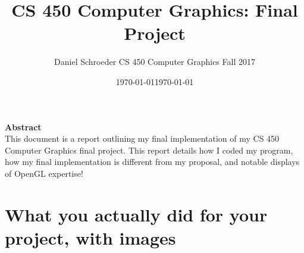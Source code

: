 \documentclass[journal,10pt,onecolumn,compsoc]{IEEEtran}
\title{CS 450 Computer Graphics: \linebreak Final Project}
\author{Daniel Schroeder \linebreak CS 450 Computer Graphics \linebreak Fall 2017}
\date{\today}
\begin{document}
  \maketitle

  \date{\today}
  \vspace{2cm}
  \begin{center}
  \noindent \textbf{Abstract} \\
              \indent This document is a report outlining my final implementation of my CS 450 Computer Graphics final project. This report details how I coded my program, how my final implementation is different from my proposal, and notable displays of OpenGL expertise!
  \end{center}         
  
  \newpage
  \tableofcontents
  \newpage

\section{What you actually did for your project, with images}
\end{document}
